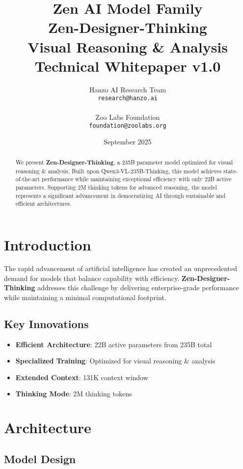 \documentclass[11pt,a4paper]{article}
\title{
    \vspace{-2cm}
    \Large \textbf{Zen AI Model Family} \\
    \vspace{0.5cm}
    \Huge \textbf{Zen-Designer-Thinking} \\
    \vspace{0.3cm}
    \large Visual Reasoning & Analysis \\
    \vspace{0.5cm}
    \normalsize Technical Whitepaper v1.0
}
\author{
    Hanzo AI Research Team \\
    \texttt{research@hanzo.ai} \\
    \\
    Zoo Labs Foundation \\
    \texttt{foundation@zoolabs.org}
}
\date{September 2025}
\begin{document}
\maketitle

\begin{abstract}
We present \textbf{Zen-Designer-Thinking}, a 235B parameter model optimized for visual reasoning & analysis. 
Built upon Qwen3-VL-235B-Thinking, this model achieves state-of-the-art performance while maintaining exceptional efficiency 
with only 22B active parameters. Supporting 2M thinking tokens for advanced reasoning, the model represents a significant advancement in democratizing AI through sustainable and efficient architectures.
\end{abstract}

\tableofcontents
\newpage

\section{Introduction}

The rapid advancement of artificial intelligence has created an unprecedented demand for models that balance capability with efficiency. 
\textbf{Zen-Designer-Thinking} addresses this challenge by delivering enterprise-grade performance while maintaining a minimal computational footprint.

\subsection{Key Innovations}
\begin{itemize}
    \item \textbf{Efficient Architecture}: 22B active parameters from 235B total
    \item \textbf{Specialized Training}: Optimized for visual reasoning & analysis
    \item \textbf{Extended Context}: 131K context window
    \item \textbf{Thinking Mode}: 2M thinking tokens
    
    
\end{itemize}

\section{Architecture}

\subsection{Model Design}
\end{document}
